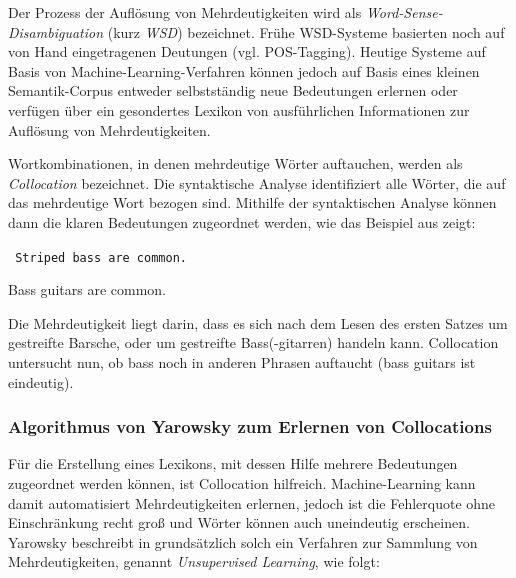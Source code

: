 \documentclass[12pt]{report}
\begin{document}
Der Prozess der Auflösung von Mehrdeutigkeiten wird als \textit{Word-Sense-Disambiguation} (kurz \textit{WSD}) bezeichnet. Frühe WSD-Systeme basierten noch auf von Hand eingetragenen Deutungen (vgl. POS-Tagging). Heutige Systeme auf Basis von Machine-Learning-Verfahren können jedoch auf Basis eines kleinen Semantik-Corpus entweder selbstständig neue Bedeutungen erlernen oder verfügen über ein gesondertes Lexikon von ausführlichen Informationen zur Auflösung von Mehrdeutigkeiten. 

Wortkombinationen, in denen mehrdeutige Wörter auftauchen, werden als \textit{Collocation} bezeichnet. Die syntaktische Analyse identifiziert alle Wörter, die auf das mehrdeutige Wort bezogen sind. Mithilfe der syntaktischen Analyse können dann die klaren Bedeutungen zugeordnet werden, wie das Beispiel aus \cite{cop04} zeigt:

\tt
Striped bass are common.

Bass guitars are common.
\rm

Die Mehrdeutigkeit liegt darin, dass es sich nach dem Lesen des ersten Satzes um gestreifte Barsche, oder um gestreifte Bass(-gitarren) handeln kann. Collocation untersucht nun, ob bass noch in anderen Phrasen auftaucht (bass guitars ist eindeutig).

\subsubsection{Algorithmus von Yarowsky zum Erlernen von Collocations}
Für die Erstellung eines Lexikons, mit dessen Hilfe mehrere Bedeutungen zugeordnet werden können, ist Collocation hilfreich. Machine-Learning kann damit automatisiert Mehrdeutigkeiten erlernen, jedoch ist die Fehlerquote ohne Einschränkung recht groß und Wörter können auch uneindeutig erscheinen. Yarowsky beschreibt in \cite{yar95} grundsätzlich solch ein Verfahren zur Sammlung von Mehrdeutigkeiten, genannt \textit{Unsupervised Learning}, wie folgt: 
\end{document}
